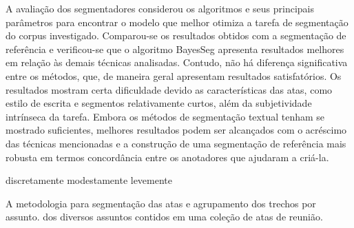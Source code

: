 

















A avaliação dos segmentadores considerou os algoritmos e seus principais parâmetros para encontrar o modelo que melhor otimiza a tarefa de segmentação do corpus investigado. Comparou-se os resultados obtidos com a segmentação de referência e verificou-se que o algoritmo BayesSeg apresenta resultados melhores em relação às demais técnicas analisadas. Contudo, não há diferença significativa entre os métodos, que,  de maneira geral apresentam resultados satisfatórios.  
Os resultados mostram certa dificuldade devido as características das atas, como estilo de escrita e segmentos relativamente curtos, além da subjetividade intrínseca da tarefa.
Embora os métodos de segmentação textual tenham se mostrado suficientes, melhores resultados podem ser alcançados com o acréscimo das técnicas mencionadas e a construção de uma segmentação de referência mais robusta em termos concordância entre os anotadores que ajudaram a criá-la.



discretamente 
modestamente
levemente

A metodologia 
para segmentação das atas e agrupamento dos trechos por assunto.  
dos diversos assuntos contidos em uma coleção de atas de reunião.




